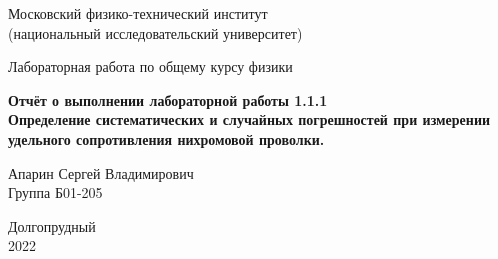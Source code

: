 



\begin{titlepage}

    \newpage
    \begin{center}
        \normalsize Московский физико-технический институт \\(национальный исследовательский университет)
    \end{center}

    \vspace{6em}

    \begin{center}
        \Large Лабораторная работа по общему курсу физики\\
    \end{center}

    \vspace{1em}

    \begin{center}
        \Large \textbf{Отчёт о выполнении лабораторной работы 1.1.1\\ {Определение систематических и случайных погрешностей при измерении удельного сопротивления нихромовой проволки.}}
    \end{center}

    \vspace{2em}

    \begin{center}
        \large Апарин Сергей Владимирович \\
        Группа Б01-205
    \end{center}

    \vspace{\fill}

    \begin{center}
        Долгопрудный \\2022
    \end{center}

\end{titlepage}


